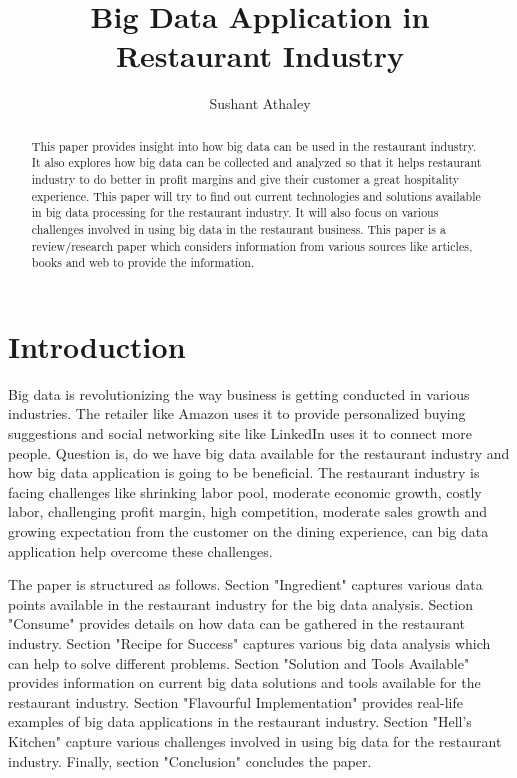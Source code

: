 \documentclass[sigconf]{acmart}
\begin{document}
\title{Big Data Application in Restaurant Industry}


\author{Sushant Athaley}



\begin{abstract}
This paper provides insight into how big data can be used in the restaurant industry. It also explores how big data can be collected and analyzed so that it helps restaurant industry to do better in profit margins and give their customer a great hospitality experience. This paper will try to find out current technologies and solutions available in big data processing for the restaurant industry. It will also focus on various challenges involved in using big data in the restaurant business. This paper is a review/research paper which considers information from various sources like articles, books and web to provide the information. 
\end{abstract}



\maketitle

\section{Introduction}
Big data is revolutionizing the way business is getting conducted in various industries. The retailer like Amazon uses it to provide personalized buying suggestions and social networking site like LinkedIn uses it to connect more people. Question is, do we have big data available for the restaurant industry and how big data application is going to be beneficial. The restaurant industry is facing challenges like shrinking labor pool, moderate economic growth, costly labor, challenging profit margin, high competition, moderate sales growth and growing expectation from the customer on the dining experience, can big data application help overcome these challenges.\cite{www-restaurant-challenges}

The paper is structured as follows. Section "Ingredient" captures various data points available in the restaurant industry for the big data analysis. Section "Consume" provides details on how data can be gathered in the restaurant industry. Section "Recipe for Success" captures various big data analysis which can help to solve different problems. Section "Solution and Tools Available" provides information on current big data solutions and tools available for the restaurant industry. Section "Flavourful Implementation" provides real-life examples of big data applications in the restaurant industry. Section "Hell's Kitchen" capture various challenges involved in using big data for the restaurant industry. Finally, section "Conclusion" concludes the paper.
\end{document}
